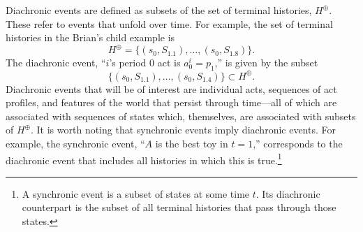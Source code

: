 \documentclass[
11pt,
titlepage,
reqno,
]{article}%
\theoremstyle{definition}
\begin{document}
Diachronic events are defined as subsets of the set of terminal histories, $H^\oplus$.
These refer to events that unfold over time.
For example, the set of terminal histories in the Brian's child example is
\[
	H^\oplus=\{(s_0,S_{1.1}),\ldots,(s_0,S_{1.8})\}.
\]
The diachronic event, ``$i$'s period 0 act is $a^i_0=p_1$,'' is given by the subset
\[
	\{(s_0,S_{1.1}),\ldots,(s_0,S_{1.4})\}\subset H^\oplus.
\] 
Diachronic events that will be of interest are individual acts, sequences of act profiles, and features of the world that persist through time---all of which are associated with sequences of states which, themselves, are associated with subsets of $H^\oplus$.
It is worth noting that synchronic events imply diachronic events.
For example, the synchronic event, ``$A$ is the best toy in $t=1$,'' corresponds to the diachronic event that includes all histories in which this is true.\footnote
{
	A synchronic event is a subset of states at some time $t$. Its diachronic counterpart is the subset of all terminal histories that pass through those states.
}



\end{document}
